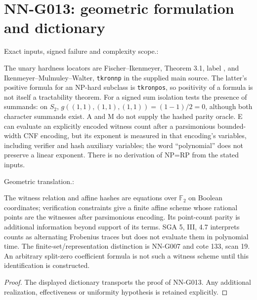 \section{NN-G013: geometric formulation and dictionary}
\begin{geometricstatement}[NN-G013]
Exact inputs, signed failure and complexity scope.:

The unary hardness locators are Fischer--Ikenmeyer,
Theorem 3.1, label ,
and Ikenmeyer--Mulmuley--Walter, \texttt{tkronnp} in the
supplied main source. The latter's positive formula for
an NP-hard subclass is \texttt{tkronpos}, so positivity of
a formula is not itself a tractability theorem.
For a signed sum isolation tests the presence of summands:
on $S_2$, $g((1,1),(1,1),(1,1))=(1-1)/2=0$, although
both character summands exist. A and M do not supply the
hashed parity oracle. E can evaluate an explicitly encoded
witness count after a parsimonious bounded-width CNF
encoding, but its exponent is measured in that encoding's
variables, including verifier and hash auxiliary variables;
the word ``polynomial'' does not preserve a linear exponent.
There is no derivation of NP=RP from the stated inputs.


Geometric translation.:

The witness relation and affine hashes are equations over
$\mathbb F_2$ on Boolean coordinates; verification constraints
give a finite affine scheme whose rational points are the
witnesses after parsimonious encoding. Its point-count
parity is additional information beyond support of its
terms. SGA 5, III, 4.7 interprets counts as alternating
Frobenius traces but does not evaluate them in polynomial
time. The finite-set/representation distinction is
NN-G007 and cote 133, scan 19. An arbitrary split-zero
coefficient formula is not such a witness scheme until
this identification is constructed.


\end{geometricstatement}
\begin{proof} The displayed dictionary transports the proof of NN-G013. Any additional realization, effectiveness or uniformity hypothesis is retained explicitly.\end{proof}


